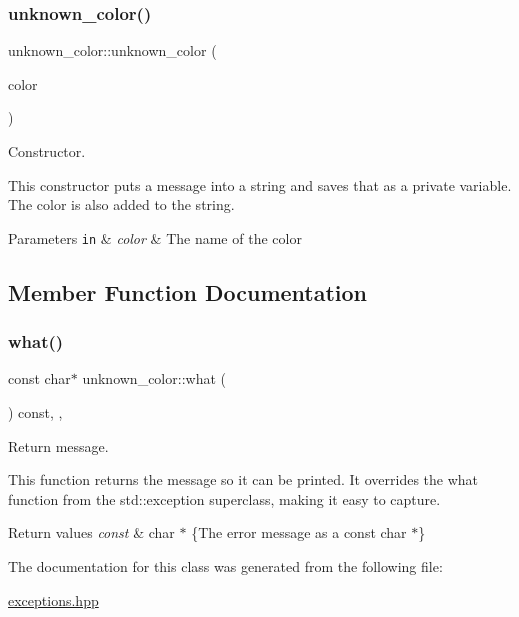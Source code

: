 \subsubsection{\texorpdfstring{unknown\+\_\+color()}{unknown\_color()}}
{\footnotesize\ttfamily unknown\+\_\+color\+::unknown\+\_\+color (\begin{DoxyParamCaption}\item[{const std\+::string}]{color }\end{DoxyParamCaption})\hspace{0.3cm}{\ttfamily [inline]}}



Constructor. 

This constructor puts a message into a string and saves that as a private variable. The color is also added to the string.


\begin{DoxyParams}[1]{Parameters}
\mbox{\tt in}  & {\em color} & The name of the color \\
\hline
\end{DoxyParams}


\subsection{Member Function Documentation}
\mbox{\label{classunknown__color_a3340e3af5b5f734727b73ddf25df3265}} 
\subsubsection{\texorpdfstring{what()}{what()}}
{\footnotesize\ttfamily const char$\ast$ unknown\+\_\+color\+::what (\begin{DoxyParamCaption}{ }\end{DoxyParamCaption}) const\hspace{0.3cm}{\ttfamily [inline]}, {\ttfamily [override]}, {\ttfamily [noexcept]}}



Return message. 

This function returns the message so it can be printed. It overrides the what function from the std\+::exception superclass, making it easy to capture.


\begin{DoxyRetVals}{Return values}
{\em const} & char $\ast$ \{The error message as a const char $\ast$\} \\
\hline
\end{DoxyRetVals}


The documentation for this class was generated from the following file\+:\begin{DoxyCompactItemize}
\item 
\hyperlink{exceptions_8hpp}{exceptions.\+hpp}\end{DoxyCompactItemize}
